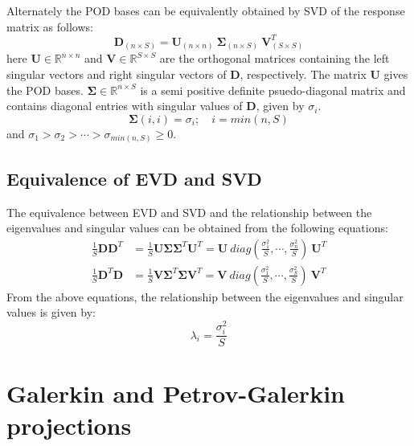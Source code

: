 \documentclass[10pt,letterpaper, onecolumn]{article}
\begin{document}
Alternately the POD bases can be equivalently obtained by SVD of the response matrix as follows:
%
\begin{equation}
\bm{D}_{(n \times S)} = \bm{U}_{(n \times n)} \   \bm{\Sigma}_{(n \times S)} \   \bm{V}^T_{(S \times S)}
\end{equation}
%
here $ \bm{U} \in \mathbb{R}^{n \times n}$ and $ \bm{V} \in \mathbb{R}^{S \times S}$ are the orthogonal matrices containing the left singular vectors and right singular vectors of $\bm{D}$, respectively. The matrix $\bm{U}$ gives the POD bases. $\bm{\Sigma} \in \mathbb{R}^{n \times S}$ is a semi positive definite psuedo-diagonal matrix and contains diagonal entries with singular values of $\bm{D}$, given by $\sigma_i$.
%
\begin{equation}
\bm{\Sigma}(i,i) = \sigma_i; \quad i = min(n,S)
\end{equation}
%
and $\sigma_1 > \sigma_2 > \cdots > \sigma_{min(n,S)} \geq 0$.

\subsection{Equivalence of EVD and SVD}

The equivalence between EVD and SVD and the relationship between the eigenvalues and singular values can be obtained from the following equations: 
%
\begin{align}
\frac{1}{S} \bm{D} \bm{D}^T &= \frac{1}{S} \bm{U} \bm{\Sigma} \bm{\Sigma}^T \bm{U}^T  = 
\bm{U} \ diag( \frac{\sigma_1^2}{S}, \cdots, \frac{\sigma_n^2}{S} ) \ \bm{U}^T \\
\frac{1}{S}  \bm{D}^T \bm{D} &= \frac{1}{S} \bm{V} \bm{\Sigma}^T \bm{\Sigma} \bm{V}^T = 
\bm{V} \ diag( \frac{\sigma_1^2}{S}, \cdots, \frac{\sigma_S^2}{S} )  \ \bm{V}^T
\end{align}
%
From the above equations, the relationship between the eigenvalues and singular values is given by:
%
\begin{equation}
\lambda_i = \frac{\sigma^2_i}{S}
\end{equation}
%



\section{Galerkin and Petrov-Galerkin projections}
\end{document}
